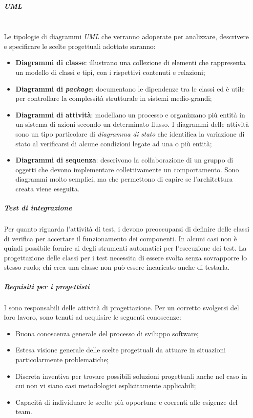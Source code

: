 	\subparagraph{UML}
	~\\Le tipologie di diagrammi \emph{UML} che verranno adoperate per analizzare, descrivere e specificare le scelte progettuali adottate saranno:
	\begin{itemize}
		\item \textbf{Diagrammi di classe}: illustrano una collezione di elementi che rappresenta un modello di classi e tipi, con i rispettivi contenuti e relazioni;
		\item \textbf{Diagrammi di } \emph{\textbf{package}}: documentano le dipendenze tra le classi ed è utile per controllare la complessità strutturale in sistemi medio-grandi;
		\item \textbf{Diagrammi di attività}: modellano un processo e organizzano più entità in un sistema di azioni secondo un determinato flusso. I diagrammi delle attività sono un tipo particolare di \emph{diagramma di stato} che identifica la variazione di stato al verificarsi di alcune condizioni legate ad una o più entità;
		\item \textbf{Diagrammi di sequenza}: descrivono la collaborazione di un gruppo di oggetti che devono implementare collettivamente un comportamento. Sono diagrammi molto semplici, ma che permettono di capire se l'architettura creata viene eseguita.
	\end{itemize}

	\subparagraph{Test di integrazione}
	Per quanto riguarda l’attività di test, i \progs{} devono preoccuparsi di definire delle classi di verifica per accertare il funzionamento dei componenti. In alcuni casi non è quindi possibile fornire ai \vers{} degli strumenti automatici per l'esecuzione dei test. La progettazione delle classi per i test necessita di essere svolta senza sovrapporre lo stesso ruolo; chi crea una classe non può essere incaricato anche di testarla.
	
	
	\subparagraph{Requisiti per i progettisti}
	I \progs{} sono responsabili delle attività di progettazione. Per un corretto svolgersi del loro lavoro, sono tenuti ad acquisire le seguenti conoscenze:
	\begin{itemize}
		\item Buona conoscenza generale del processo di sviluppo software;
		\item Estesa visione generale delle scelte progettuali da attuare in situazioni particolarmente problematiche;
		\item Discreta inventiva per trovare possibili soluzioni progettuali anche nel caso in cui non vi siano casi metodologici esplicitamente applicabili;
		\item Capacità di individuare le scelte più opportune e coerenti alle esigenze del team.
	\end{itemize}

